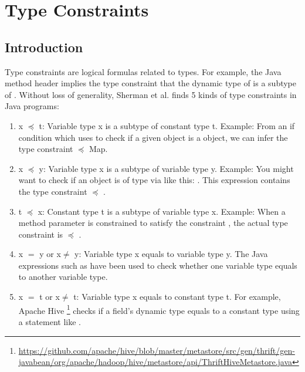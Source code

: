 \chapter{Type Constraints}

\section{Introduction}
 Type constraints are logical formulas related to types. For example, the Java method header  implies the type constraint that the dynamic type of  is a subtype of .  Without loss of generality, Sherman et al. \cite{Sherman:2015:DTP:2776776.2755971} finds 5 kinds of type constraints in Java programs:
 
\begin{enumerate}
    \item x $\preceq$ t: Variable type x is a subtype of constant type t. Example: From an if condition which uses  to check if a given object  is a  object, we can infer the type constraint  $\preceq$ Map.  
  \item x $\preceq$ y: Variable type x is a subtype of variable type y. Example: You might want to check if an object  is of type  via  like this: . This expression contains the type constraint  $\preceq$ .
  \item t $\preceq$ x: Constant type t is a subtype of variable type x. Example: When a method parameter  is constrained to satisfy the  constraint , the actual type constraint is  $\preceq$ .
  \item x $=$ y or x$\neq$ y: Variable type x equals to variable type y. The Java expressions such as  have been used to check whether one variable type equals to another variable type.
  \item x $=$ t or x$\neq$ t: Variable type x equals to constant type t. For example, Apache Hive \footnote{\url{https://github.com/apache/hive/blob/master/metastore/src/gen/thrift/gen-javabean/org/apache/hadoop/hive/metastore/api/ThriftHiveMetastore.java}} checks if a field's dynamic type equals to a constant type using a statement like .
\end{enumerate}


